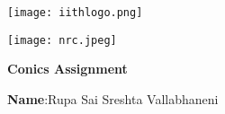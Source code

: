 \documentclass[10pt,a4paper]{report}
\begin{document}
\begin{figure*}[!tbp]
  \centering
  \begin{minipage}[b]{0.4\textwidth}
   \texttt{[image: iithlogo.png]} 
  \end{minipage}
  \hfill
  \vspace{5mm}\begin{minipage}[b]{0.4\textwidth}
\raggedleft \texttt{[image: nrc.jpeg]} 
  \end{minipage}\vspace{0.2cm}
\end{figure*}
\raggedright 
\begin{center}
\Large \textbf{Conics Assignment}\hspace{2.5cm} %
\end{center}
\begin{center}
\hspace{0.5cm}
\textbf{Name}:\hspace{2mm}Rupa Sai Sreshta Vallabhaneni\hspace{1cm}
\date{25-September-2022}
\end{center}
\end{document}
